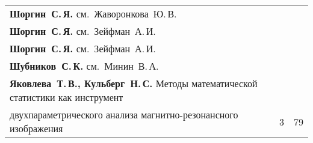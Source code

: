 {\begin{tabular}{p{388pt}rr}
\textbf{Шоргин~С.\,Я.} см.\ Жаворонкова~Ю.\,В.&&\\
\textbf{Шоргин~С.\,Я.} см.\ Зейфман~А.\,И.&&\\
\textbf{Шоргин~С.\,Я.} см.\ Зейфман~А.\,И.&&\\
\textbf{Шубников~С.\,К.} см.\ Минин~В.\,А.&&\\
\textbf{Яковлева~Т.\,В., Кульберг~Н.\,С.} Методы математической статистики как
инструмент\linebreak
\vspace*{-12pt}\\
\hspace*{23pt}двухпараметрического анализа магнитно-резонансного изображения\dotfill&3&79\\
\end{tabular}
}

\def\leftfootline{\small{\textbf{\thepage}
\hfill ИНФОРМАТИКА И ЕЁ ПРИМЕНЕНИЯ\ \ \ том~8\ \ \ выпуск~4\ \ \ 2014}
}%
 \def\rightfootline{\small{ИНФОРМАТИКА И ЕЁ ПРИМЕНЕНИЯ\ \ \ том~8\ \ \ выпуск~4\ \ \ 2014
 \hfill \textbf{\thepage}}}

 \label{end\stat}
